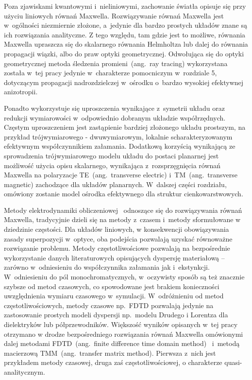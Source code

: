 
Poza zjawiskami kwantowymi i~nieliniowymi, zachowanie światła opisuje się przy użyciu liniowych równań Maxwella. Rozwiązywanie równań Maxwella jest w~ogólności niezmiernie złożone, a~jedynie dla bardzo prostych układów znane są ich rozwiązania analityczne. Z tego względu, tam gdzie jest to możliwe, równania Maxwella upraszcza się do skalarnego równania Helmholtza lub dalej do równania propagacji wiązki, albo do praw optyki geometrycznej. Odwołująca się do optyki geometrycznej metoda śledzenia promieni~(ang.~ray tracing) wykorzystana została w~tej pracy jedynie w~charakterze pomocniczym w~rozdziale 5, dotyczącym propagacji nadrozdzielczej w~ośrodku o~bardzo wysokiej efektywnej anizotropii. 

Ponadto wykorzystuje się uproszczenia wynikające z~symetrii układu oraz redukcji wymiarowości w~odpowiednio dobranym układzie współrzędnych. Częstym uproszczeniem jest zastąpienie bardziej złożonego układu prostszym, na przykład trójwymiarowego - dwuwymiarowym, lokalnie scharakteryzowanym efektywnym współczynnikiem załamania. Dodatkową korzyścią wynikającą ze sprowadzenia trójwymiarowego modelu układu do postaci planarnej jest możliwość użycia opisu skalarnego, wynikająca z~rozsprzęgnięcia równań Maxwella na polaryzacje TE~(ang.~transverse electric) i~TM~(ang.~transverse magnetic) zachodzące dla układów planarnych. W~dalszej części rozdziału, omówiony zostanie model ośrodka efektywnego dla struktur cienkowarstwowych.

Metody elektrodynamiki obliczeniowej~\cite{bondeson2005computational} odnoszące się do rozwiązywania równań Maxwella, tradycyjnie dzieli się na metody z~czasem i~metody sformułowane w dziedzinie częstości. Dla układów liniowych, w konsekwencji obowiązywania zasady superpozycji w~optyce, oba podejścia pozwalają uzyskać równoważne rozwiązanie problemu. Metody częstotliwościowe pozwalają na bezpośrednie wykorzystanie danych literaturowych opisujących dyspersję materiałową – zarówno w~odniesieniu do współczynnika załamania jak i~ekstynkcji. W~odniesieniu do pól monochromatycznych, w~oczywisty sposób są też znacznie szybsze od metod czasowych, co spowodowane jest brakiem konieczności uwzględnienia wymiaru czasowego w~symulacji. W~odróżnieniu od metod częstotliwościowych, metody czasowe np.~FDTD pozwalają jedynie na zastosowanie prostych modeli dyspersji np.~modelu Drudego i Lorentza dla dielektryków lub półprzewodników. Większość wyników opisanych w~tej pracy otrzymano w drodze bezpośredniego rozwiązania równań Maxwella omówionymi dalej metodami FDTD~(ang.~finite difference time domain method)~\cite{taflove1995computational} i~metodą macierzową TMM~(ang.~transfer matrix method). Pierwsza z~nich jest przykładem metody czasowej, druga zaś częstotliwościowej, o charakterze quasi-analitycznym. 

